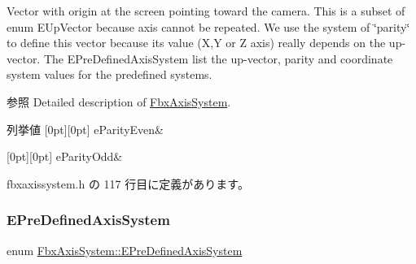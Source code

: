 Vector with origin at the screen pointing toward the camera. This is a subset of enum E\+Up\+Vector because axis cannot be repeated. We use the system of \char`\"{}parity\char`\"{} to define this vector because its value (X,Y or Z axis) really depends on the up-\/vector. The E\+Pre\+Defined\+Axis\+System list the up-\/vector, parity and coordinate system values for the predefined systems. \begin{DoxySeeAlso}{参照}
Detailed description of \hyperlink{class_fbx_axis_system}{Fbx\+Axis\+System}. 
\end{DoxySeeAlso}
\begin{DoxyEnumFields}{列挙値}
[0pt][0pt]{}\mbox{\label{class_fbx_axis_system_a34bce1daad7ed6ae71916bb825d3ec87a60d99824537be50ebc6aa4169438da55}} 
e\+Parity\+Even&\\
\hline

[0pt][0pt]{}\mbox{\label{class_fbx_axis_system_a34bce1daad7ed6ae71916bb825d3ec87a918bd8db749bc1ed4f2f176c27e67023}} 
e\+Parity\+Odd&\\
\hline

\end{DoxyEnumFields}


 fbxaxissystem.\+h の 117 行目に定義があります。

\mbox{\label{class_fbx_axis_system_a0391b88959ec9ed790cb76eac9a6ed17}} 
\subsubsection{\texorpdfstring{E\+Pre\+Defined\+Axis\+System}{EPreDefinedAxisSystem}}
{\footnotesize\ttfamily enum \hyperlink{class_fbx_axis_system_a0391b88959ec9ed790cb76eac9a6ed17}{Fbx\+Axis\+System\+::\+E\+Pre\+Defined\+Axis\+System}}


